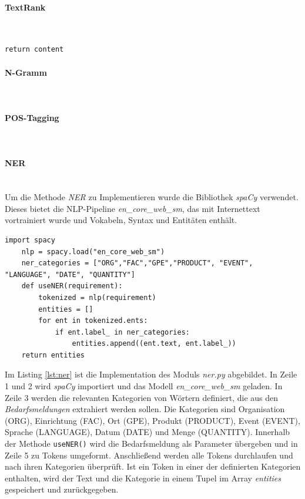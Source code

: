 \paragraph{TextRank}\mbox{}\\
\begin{lstlisting}[caption={Implementation des Moduls \emph{textRankingAlgorithm.py}}, label=lst:textrank]
	return content
\end{lstlisting}

\paragraph{N-Gramm}\mbox{}\\

\paragraph{POS-Tagging}\mbox{}\\

\paragraph{NER}\mbox{}\\
Um die Methode \emph{NER} zu Implementieren wurde die Bibliothek \emph{spaCy} verwendet. Dieses bietet die NLP-Pipeline \emph{en\_core\_web\_sm}, das mit Internettext vortrainiert wurde und Vokabeln, Syntax und Entitäten enthält.
\begin{lstlisting}[caption={Implementation des Moduls \emph{ner.py}}, label=lst:ner]
	import spacy
	nlp = spacy.load("en_core_web_sm")
	ner_categories = ["ORG","FAC","GPE","PRODUCT", "EVENT", "LANGUAGE", "DATE", "QUANTITY"]
	def useNER(requirement):
		tokenized = nlp(requirement)
		entities = []
		for ent in tokenized.ents:
			if ent.label_ in ner_categories:
				entities.append((ent.text, ent.label_))
	return entities
\end{lstlisting}
Im Listing \ref{lst:ner} ist die Implementation des Moduls \emph{ner.py} abgebildet. In Zeile 1 und 2 wird \emph{spaCy} importiert und das Modell \emph{en\_core\_web\_sm} geladen. In Zeile 3 werden die relevanten Kategorien von Wörtern definiert, die aus den \emph{Bedarfsmeldungen} extrahiert werden sollen. Die Kategorien sind Organisation (ORG), Einrichtung (FAC), Ort (GPE), Produkt (PRODUCT), Event (EVENT), Sprache (LANGUAGE), Datum (DATE) und Menge (QUANTITY). Innerhalb der Methode \lstinline{useNER()} wird die Bedarfsmeldung als Parameter übergeben und in Zeile 5 zu Tokens umgeformt. Anschließend werden alle Tokens durchlaufen und nach ihren Kategorien überprüft. Ist ein Token in einer der definierten Kategorien enthalten, wird der Text und die Kategorie in einem Tupel im Array \emph{entities} gespeichert und zurückgegeben.
